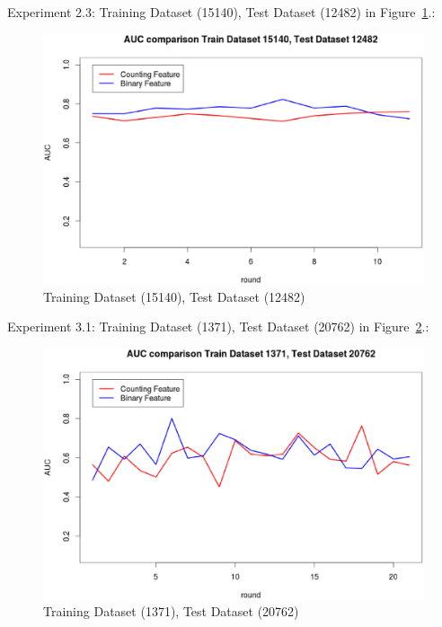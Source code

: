 \documentclass{sig-alternate}
\begin{document}
Experiment 2.3: Training Dataset  (15140), Test Dataset  (12482) in Figure~\ref{fig:fig5}.:
\begin{figure}[h]
\centering
\includegraphics[width=\columnwidth]{15140_12482.eps}
\caption{Training Dataset  (15140), Test Dataset  (12482) }
\label{fig:fig5}
\end{figure}

Experiment 3.1: Training Dataset  (1371), Test Dataset  (20762) in Figure~\ref{fig:fig6}.:
\begin{figure}[h]
\centering
\includegraphics[width=\columnwidth]{1371_20762.eps}
\caption{ Training Dataset  (1371), Test Dataset  (20762)}
\label{fig:fig6}
\end{figure}
\end{document}
